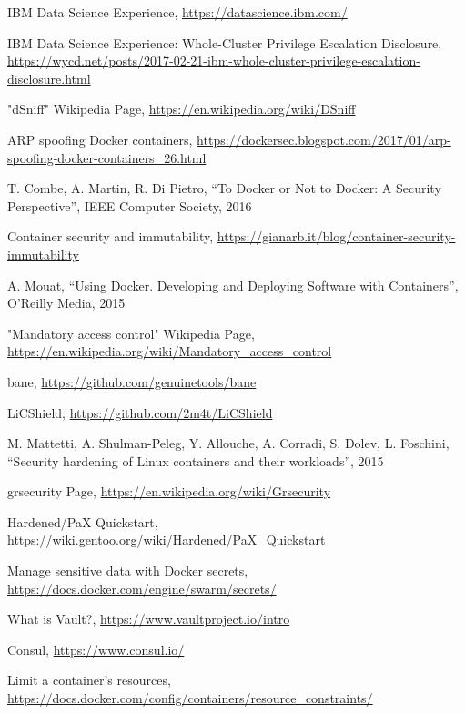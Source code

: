 \documentclass[a4paper,12pt]{article}
\begin{document}
\begin{thebibliography}{99}
IBM Data Science Experience, \url{https://datascience.ibm.com/}

IBM Data Science Experience: Whole-Cluster Privilege Escalation Disclosure,
\url{https://wycd.net/posts/2017-02-21-ibm-whole-cluster-privilege-escalation-disclosure.html}

"dSniff" Wikipedia Page, \url{https://en.wikipedia.org/wiki/DSniff}

ARP spoofing Docker containers,
\url{https://dockersec.blogspot.com/2017/01/arp-spoofing-docker-containers_26.html}

T. Combe, A. Martin, R. Di Pietro, ``To Docker or Not to Docker: A Security
Perspective'', IEEE Computer Society, 2016

Container security and immutability,
\url{https://gianarb.it/blog/container-security-immutability}

A. Mouat, ``Using Docker. Developing and Deploying Software with Containers'',
O'Reilly Media, 2015

"Mandatory access control" Wikipedia Page,
\url{https://en.wikipedia.org/wiki/Mandatory_access_control}

bane, \url{https://github.com/genuinetools/bane}

LiCShield, \url{https://github.com/2m4t/LiCShield}

M. Mattetti, A. Shulman-Peleg, Y. Allouche, A. Corradi, S. Dolev, L. Foschini,
``Security hardening of Linux containers and their workloads'', 2015

grsecurity Page, \url{https://en.wikipedia.org/wiki/Grsecurity}


Hardened/PaX Quickstart,
\url{https://wiki.gentoo.org/wiki/Hardened/PaX_Quickstart}

Manage sensitive data with Docker secrets,
\url{https://docs.docker.com/engine/swarm/secrets/}

What is Vault?, \url{https://www.vaultproject.io/intro}

Consul, \url{https://www.consul.io/}

Limit a container's resources,
\url{https://docs.docker.com/config/containers/resource_constraints/}


\end{thebibliography}
\end{document}
